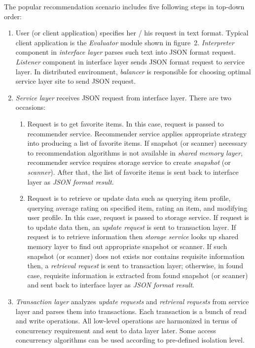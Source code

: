 \documentclass[a4paper]{llncs}
\begin{document}
The popular recommendation scenario includes five following steps in top-down order:
\begin{enumerate}
\item User (or client application) specifies her / his request in text format. Typical client application is the \textit{Evaluator} module shown in figure~2. \textit{Interpreter} component in \textit{interface layer} parses such text into JSON format request. \textit{Listener} component in interface layer sends JSON format request to service layer. In distributed environment, \textit{balancer} is responsible for choosing optimal service layer site to send JSON request.
\item \textit{Service layer} receives JSON request from interface layer. There are two occasions:
  \begin{enumerate}
  \item Request is to get favorite items. In this case, request is passed to recommender service. Recommender service applies appropriate strategy into producing a list of favorite items. If snapshot (or scanner) necessary to recommendation algorithms is not available in \textit{shared memory layer}, recommender service requires storage service to create \textit{snapshot} (or \textit{scanner}). After that, the list of favorite items is sent back to interface layer as \textit{JSON format result}.
  \item Request is to retrieve or update data such as querying item profile, querying average rating on specified item, rating an item, and modifying user profile. In this case, request is passed to storage service. If request is to update data then, an \textit{update request} is sent to transaction layer. If request is to retrieve information then \textit{storage service} looks up shared memory layer to find out appropriate snapshot or scanner. If such snapshot (or scanner) does not exists nor contains requisite information then, a \textit{retrieval request} is sent to transaction layer; otherwise, in found case, requisite information is extracted from found snapshot (or scanner) and sent back to interface layer as \textit{JSON format result}.
  \end{enumerate}
\item \textit{Transaction layer} analyzes \textit{update requests} and \textit{retrieval requests} from service layer and parses them into transactions. Each transaction is a bunch of read and write operations. All low-level operations are harmonized in terms of concurrency requirement and sent to data layer later. Some access concurrency algorithms can be used according to pre-defined isolation level.

\end{enumerate}
\end{document}
